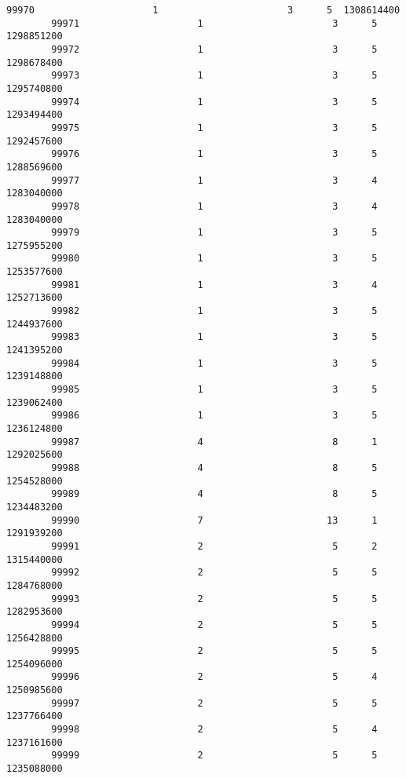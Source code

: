 \documentclass[11pt]{article}
\begin{document}
\begin{Verbatim}[commandchars=\\\{\}]
        99970                     1                       3      5  1308614400   
        99971                     1                       3      5  1298851200   
        99972                     1                       3      5  1298678400   
        99973                     1                       3      5  1295740800   
        99974                     1                       3      5  1293494400   
        99975                     1                       3      5  1292457600   
        99976                     1                       3      5  1288569600   
        99977                     1                       3      4  1283040000   
        99978                     1                       3      4  1283040000   
        99979                     1                       3      5  1275955200   
        99980                     1                       3      5  1253577600   
        99981                     1                       3      4  1252713600   
        99982                     1                       3      5  1244937600   
        99983                     1                       3      5  1241395200   
        99984                     1                       3      5  1239148800   
        99985                     1                       3      5  1239062400   
        99986                     1                       3      5  1236124800   
        99987                     4                       8      1  1292025600   
        99988                     4                       8      5  1254528000   
        99989                     4                       8      5  1234483200   
        99990                     7                      13      1  1291939200   
        99991                     2                       5      2  1315440000   
        99992                     2                       5      5  1284768000   
        99993                     2                       5      5  1282953600   
        99994                     2                       5      5  1256428800   
        99995                     2                       5      5  1254096000   
        99996                     2                       5      4  1250985600   
        99997                     2                       5      5  1237766400   
        99998                     2                       5      4  1237161600   
        99999                     2                       5      5  1235088000   
        

\end{Verbatim}
\end{document}
